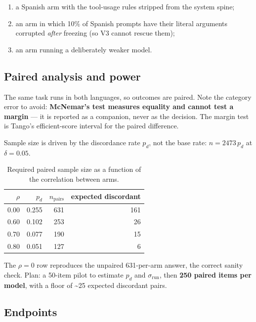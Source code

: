 \begin{enumerate}
  \item a Spanish arm with the tool-usage rules stripped from the system spine;
  \item an arm in which 10\% of Spanish prompts have their literal arguments corrupted
        \emph{after} freezing (so V3 cannot rescue them);
  \item an arm running a deliberately weaker model.
\end{enumerate}

\subsection{Paired analysis and power}
\label{sec:paired-analysis-and-power}

The same task runs in both languages, so outcomes are paired. Note the category error
to avoid: \textbf{McNemar's test measures equality and cannot test a margin} --- it is
reported as a companion, never as the decision. The margin test is Tango's
efficient-score interval for the paired difference.

Sample size is driven by the discordance rate $p_d$, not the base rate:
$n = 2473\,p_d$ at $\delta = 0.05$.

\begin{table}[htbp]
\centering
\small
\caption{Required paired sample size as a function of the correlation between arms.}
\label{tab:power-paired-sample-size}
\begin{tabular}{@{}rrrr@{}}
\toprule
$\rho$ & $p_d$ & $n_{\text{pairs}}$ & expected discordant \\
\midrule
0.00 & 0.255 & 631 & 161 \\
0.60 & 0.102 & 253 & 26 \\
0.70 & 0.077 & 190 & 15 \\
0.80 & 0.051 & 127 & 6 \\
\bottomrule
\end{tabular}
\end{table}

The $\rho = 0$ row reproduces the unpaired 631-per-arm answer, the correct sanity
check. Plan: a 50-item pilot to estimate $p_d$ and $\sigma_{\text{run}}$, then
\textbf{250 paired items per model}, with a floor of \textasciitilde{}25 expected
discordant pairs.

\subsection{Endpoints}
\label{sec:endpoints}

